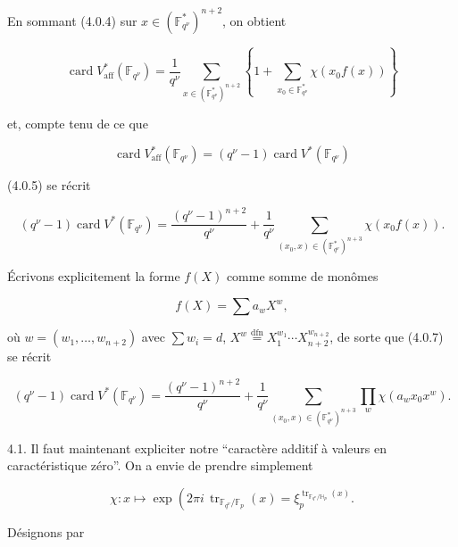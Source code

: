 En sommant (4.0.4) sur $x\in(\mathbb F_{q^\nu}^*)^{n+2}$, on obtient

\begin{equation}\tag{4.0.5}
\operatorname{card}V^*_{\mathrm{aff}}(\mathbb F_{q^\nu})
=\frac1{q^\nu}
\sum_{x\in(\mathbb F_{q^\nu}^*)^{n+2}}
\left\{1+\sum_{x_0\in\mathbb F_{q^\nu}^*}\chi(x_0f(x))\right\}
\end{equation}

et, compte tenu de ce que

\begin{equation}\tag{4.0.6}
\operatorname{card}V^*_{\mathrm{aff}}(\mathbb F_{q^\nu})
=(q^\nu-1)\operatorname{card}V^*(\mathbb F_{q^\nu})
\end{equation}

(4.0.5) se récrit

\begin{equation}\tag{4.0.7}
(q^\nu-1)\operatorname{card}V^*(\mathbb F_{q^\nu})
=\frac{(q^\nu-1)^{n+2}}{q^\nu}
+\frac1{q^\nu}
\sum_{(x_0,x)\in(\mathbb F_{q^\nu}^*)^{n+3}}\chi(x_0f(x)).
\end{equation}

Écrivons explicitement la forme $f(X)$ comme somme de monômes

\begin{equation}\tag{4.0.8}
f(X)=\sum a_wX^w,
\end{equation}

où $w=(w_1,\ldots,w_{n+2})$ avec $\sum w_i=d$,
$X^w\overset{\mathrm{dfn}}{=}X_1^{w_1}\cdots X_{n+2}^{w_{n+2}}$, de sorte
que (4.0.7) se récrit

\begin{equation}\tag{4.0.9}
(q^\nu-1)\operatorname{card}V^*(\mathbb F_{q^\nu})
=\frac{(q^\nu-1)^{n+2}}{q^\nu}
+\frac1{q^\nu}
\sum_{(x_0,x)\in(\mathbb F_{q^\nu}^*)^{n+3}}
\prod_w\chi(a_wx_0x^w).
\end{equation}

4.1. Il faut maintenant expliciter notre ``caractère additif à valeurs en
caractéristique zéro''. On a envie de prendre simplement

\begin{equation}\tag{4.1.0}
\chi:x\longmapsto
\exp\!\left(2\pi i\,\operatorname{tr}_{\mathbb F_{q^\nu}/\mathbb F_p}(x)\right.
=\xi_p^{\operatorname{tr}_{\mathbb F_{q^\nu}/\mathbb H_p}(x)}.
\end{equation}


Désignons par

